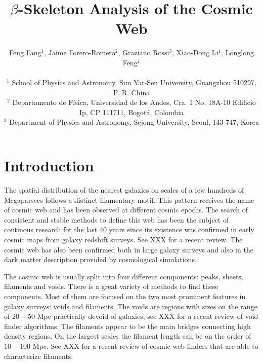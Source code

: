 \documentclass[useAMS,usenatbib]{mnras}
\begin{document}
\title[$\beta$-Skeleton Analysis]{$\beta$-Skeleton Analysis of the Cosmic Web}

\author[Fang, Forero-Romero, Rossi, Li \& Feng (2018)]
{Feng Fang$^1$, Jaime Forero-Romero$^2$, Graziano Rossi$^3$, Xiao-Dong Li$^1$, Longlong Feng$^1$ \\ \\
$^1$ School of Physics and Astronomy, Sun Yat-Sen University, Guangzhou 510297, P. R. China \\
$^2$ Departamento de F{\'i}sica, Universidad de los Andes, Cra. 1 No. 18A-10 Edificio Ip, CP 111711, Bogot{\'a}, Colombia \\
$^3$ Department of Physics and Astronomy, Sejong University, Seoul, 143-747, Korea}

\pagerange{\pageref{firstpage}--\pageref{lastpage}} 
\maketitle
\label{firstpage}


 

\section{Introduction}

The spatial distribution of the nearest galaxies on scales of a few
hundreds of Megaparsecs follows a distinct filamentary motif.
This pattern receives the name of cosmic web and has been observed at
different cosmic epochs.  
The search of consistent and stable methods to define this web has
been the subject of continous research for the last 40 years since its
existence was confirmed in early cosmic maps from galaxy redshift
surveys.
See XXX for a recent review.
The cosmic web has also been confirmed both in large galaxy surveys
and also in the dark matter description provided by cosmological
simulations.  

The cosmic web is usually split into four different components: peaks,
sheets, filaments and voids.
There is a great variety of methods to find these components. 
Most of them are focused on the two most prominent features in galaxy
surveys: voids and filaments. 
The voids are regions with sizes on the range of $20-50$ Mpc
practically devoid of galaxies, see XXX for a recent review of
void finder algorithms.
The filaments appear to be the main bridges connecting high
density regions. 
On the largest scales the filament length can be on the order of
$10-100$ Mpc.
See XXX for a recent review of cosmic web finders that are able to
characterize filaments. 
\end{document}

